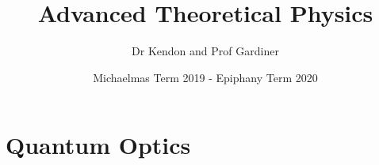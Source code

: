 \documentclass[a4paper, 11pt, normalem]{report}
\title{Advanced Theoretical Physics \vspace{-20pt}}
\author{Dr Kendon and Prof Gardiner}
\date{\vspace{-15pt}Michaelmas Term 2019 - Epiphany Term 2020}
\begin{document}
\maketitle
\tableofcontents

\part{Quantum Optics}
\end{document}
